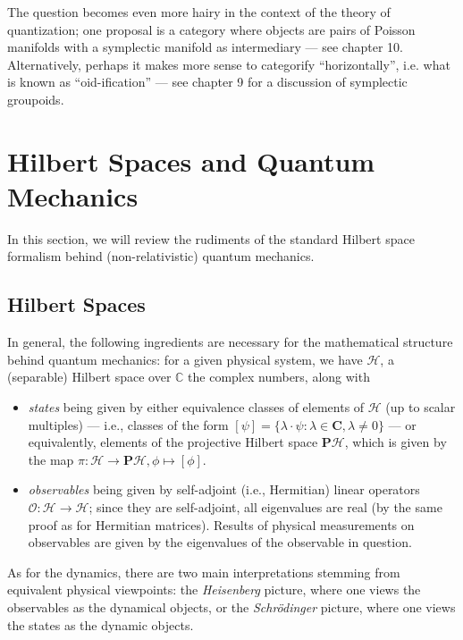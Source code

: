 \documentclass{tufte-handout}
\begin{document}
The question becomes even more hairy in the context of the theory of quantization; one proposal is a category where objects are pairs of Poisson manifolds with a symplectic manifold as intermediary --- see chapter 10. Alternatively, perhaps it makes more sense to categorify ``horizontally'', i.e. what is known as ``oid-ification'' --- see chapter 9 for a discussion of symplectic groupoids.


\section{Hilbert Spaces and Quantum Mechanics}
In this section, we will review the rudiments of the standard Hilbert space formalism behind (non-relativistic) quantum mechanics.

\subsection{Hilbert Spaces}
In general, the following ingredients are necessary for the mathematical structure behind quantum mechanics: for a given physical system, we have $\mathcal{H}$, a (separable) Hilbert space over $\mathbb{C}$ the complex numbers, along with
\begin{itemize}
\item \emph{states} being given by either equivalence classes of elements of $\mathcal{H}$ (up to scalar multiples) --- i.e., classes of the form $[\psi] = \{\lambda \cdot \psi : \lambda \in \mathbf{C}, \lambda \neq 0 \}$ --- or equivalently, elements of the projective Hilbert space $\mathbf{P}\mathcal{H}$, which is given by the map $\pi: \mathcal{H} \to \mathbf{P}\mathcal{H}, \phi \mapsto [\phi]$.
\item \emph{observables} being given by self-adjoint (i.e., Hermitian) linear operators $\mathcal{O}: \mathcal{H} \to \mathcal{H}$; since they are self-adjoint, all eigenvalues are real (by the same proof as for Hermitian matrices). Results of physical measurements on observables are given by the eigenvalues of the observable in question.
\end{itemize}

As for the dynamics, there are two main interpretations stemming from equivalent physical viewpoints: the \emph{Heisenberg} picture, where one views the observables as the dynamical objects, or the \emph{Schr\"{o}dinger} picture, where one views the states as the dynamic objects.
\end{document}

